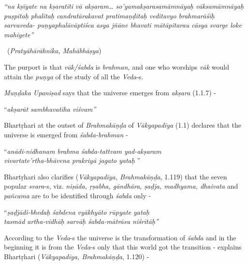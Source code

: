\begin{myquote}
\textit{“na kṣīyate na kṣaratīti vā akṣaram… so’yamakṣarasamāmnāyaḥ vāksamāmnāyaḥ puṣpitaḥ phalitaḥ candratārakavat pratimaṇḍitaḥ veditavyo brahmarāśiḥ sarvaveda- puṇyaphalāvāptiśca asya jñāne bhavati mātāpitarau cāsya svarge loke mahīyete”} 

~\hfill (\textit{Pratyāhārāhnika, Mahābhāṣya})
\end{myquote}

The purport is that \textit{vāk/śabda} is \textit{brahman,} and one who worships \textit{vāk} would attain the \textit{puṇya} of the study of all the \textit{Veda}-s.

\textit{Muṇḍaka Upaniṣad} says that the universe emerges from \textit{akṣara} (1.1.7) -

\begin{longquote}
“\textit{akṣarāt sambhavatīha viśvam”}
\end{longquote}

Bhartṛhari at the outset of \textit{Brahmakāṇḍa} of \textit{Vākyapadīya} (1.1) declares that the universe is emerged from \textit{śabda-brahman} -

\newpage

\begin{longquote}
“\textit{anādi-nidhanam brahma śabda-tattvam yad-akṣaram }\\ \textit{vivartate’rtha-bhāvena prakriyā jagato yataḥ} ”
\end{longquote}

Bhartṛhari also clarifies (\textit{Vākyapadīya, Brahmakāṇḍa}, 1.119) that the seven popular \textit{svara}-s, viz. \textit{niṣāda, ṛṣabha, gāndhāra, ṣaḍja, madhyama, dhaivata} and \textit{pañcama} are to be identified through \textit{śabda} only -

\begin{longquote}
“\textit{ṣaḍjādi-bhedaḥ śabdena vyākhyāto rūpyate yataḥ }\\ \textit{tasmād artha-vidhāḥ sarvāḥ śabda-mātrāsu niśritāḥ”} 
\end{longquote}

According to the \textit{Veda}-s the universe is the transformation of \textit{śabda} and in the beginning it is from the \textit{Veda}-s only that this world got the transition - explains Bhartṛhari (\textit{Vākyapadīya, Brahmakāṇḍa}, 1.120) -

